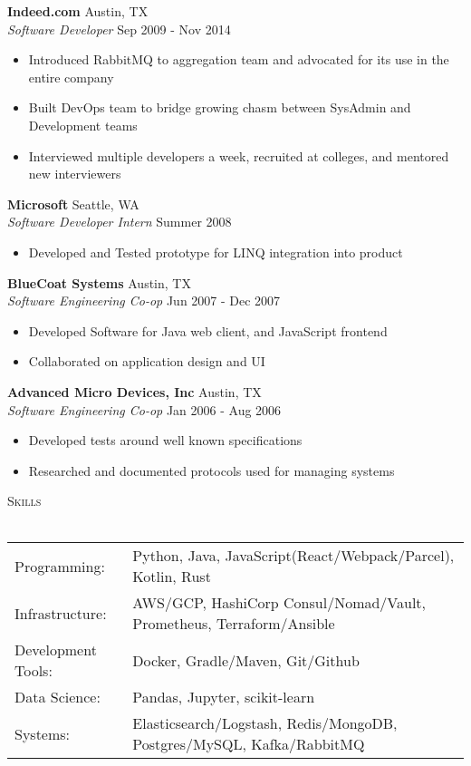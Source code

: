 \documentclass[a4paper]{article}
\newcommand{\lineunder} {
    \vspace*{-8pt} \\
    \hspace*{-18pt} \hrulefill \\
}
\newcommand{\header} [1] {
    {\hspace*{-18pt}\vspace*{6pt} \textsc{#1}}
    \vspace*{-6pt} \lineunder
}
\begin{document}
\textbf{Indeed.com} \hfill Austin, TX\\
\textit{Software Developer} \hfill Sep 2009 - Nov 2014\\
\vspace{-1mm}
\begin{itemize} \itemsep 1pt
\item Introduced RabbitMQ to aggregation team and advocated for its use in the entire company
\item Built DevOps team to bridge growing chasm between SysAdmin and Development teams
\item Interviewed multiple developers a week, recruited at colleges, and mentored new interviewers
\end{itemize}

\textbf{Microsoft} \hfill Seattle, WA\\
\textit{Software Developer Intern} \hfill Summer 2008\\
\vspace{-1mm}
\begin{itemize} \itemsep 1pt
\item Developed and Tested prototype for LINQ integration into product
\end{itemize}

\textbf{BlueCoat Systems} \hfill Austin, TX\\
\textit{Software Engineering Co-op} \hfill Jun 2007 - Dec 2007\\
\vspace{-1mm}
\begin{itemize} \itemsep 1pt
\item Developed Software for Java web client, and JavaScript frontend
\item Collaborated on application design and UI
\end{itemize}

\textbf{Advanced Micro Devices, Inc} \hfill Austin, TX\\
\textit{Software Engineering Co-op} \hfill Jan 2006 - Aug 2006\\
\vspace{-1mm}
\begin{itemize} \itemsep 1pt
\item Developed tests around well known specifications
\item Researched and documented protocols used for managing systems
\end{itemize}

\header{Skills}
\begin{tabular}{ l l }
    Programming: & Python, Java, JavaScript(React/Webpack/Parcel), Kotlin, Rust\\
    Infrastructure: & AWS/GCP, HashiCorp Consul/Nomad/Vault, Prometheus, Terraform/Ansible\\
    Development Tools: & Docker, Gradle/Maven, Git/Github\\
    Data Science: & Pandas, Jupyter, scikit-learn \\
    Systems: & Elasticsearch/Logstash, Redis/MongoDB, Postgres/MySQL, Kafka/RabbitMQ\\
\end{tabular}
\vspace{2mm}
\end{document}
